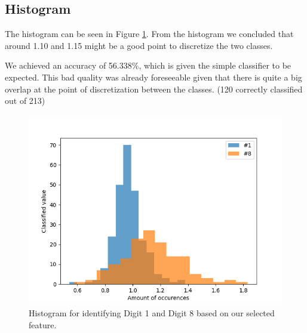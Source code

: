 \documentclass{article}
\begin{document}
\subsection{Histogram}
The histogram can be seen in Figure \ref{fig:histogram}.
From the histogram we concluded that around 1.10 and 1.15 might be a good point to discretize the two classes.

We achieved an accuracy of 56.338\%, which is given the simple classifier to be expected. This bad quality was already foreseeable given that there is quite a big overlap at the point of discretization between the classes. (120 correctly classified out of 213)
\begin{figure}[H]
\centering
\includegraphics[width=0.9\linewidth]{img/histogram.png}
\caption{Histogram for identifying Digit 1 and Digit 8 based on our selected feature.}
\label{fig:histogram}
\end{figure}
\end{document}

